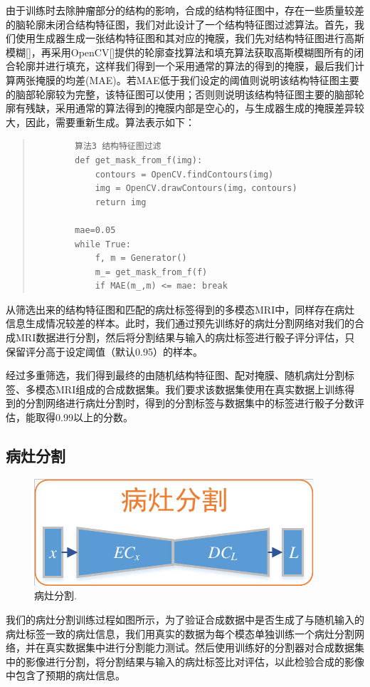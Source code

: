 \documentclass[letterpaper]{article} %
\begin{document}
由于训练时去除肿瘤部分的结构的影响，合成的结构特征图中，存在一些质量较差的脑轮廓未闭合结构特征图，我们对此设计了一个结构特征图过滤算法。首先，我们使用生成器生成一张结构特征图和其对应的掩膜，我们先对结构特征图进行高斯模糊[]，再采用OpenCV[]提供的轮廓查找算法和填充算法获取高斯模糊图所有的闭合轮廓并进行填充，这样我们得到一个采用通常的算法的得到的掩膜，最后我们计算两张掩膜的均差(MAE)。若MAE低于我们设定的阈值则说明该结构特征图主要的脑部轮廓较为完整，该特征图可以使用；否则则说明该结构特征图主要的脑部轮廓有残缺，采用通常的算法得到的掩膜内部是空心的，与生成器生成的掩膜差异较大，因此，需要重新生成。算法表示如下：
\begin{quote}
	\begin{scriptsize}\begin{verbatim}
		算法3 结构特征图过滤
		def get_mask_from_f(img):
			contours = OpenCV.findContours(img)
			img = OpenCV.drawContours(img，contours)
			return img
		
		mae=0.05
		while True:
			f, m = Generator()
			m_= get_mask_from_f(f)	
			if MAE(m_,m) <= mae: break
		\end{verbatim}\end{scriptsize}
\end{quote}

从筛选出来的结构特征图和匹配的病灶标签得到的多模态MRI中，同样存在病灶信息生成情况较差的样本。此时，我们通过预先训练好的病灶分割网络对我们的合成MRI数据进行分割，然后将分割结果与输入的病灶标签进行骰子评分评估，只保留评分高于设定阈值（默认0.95）的样本。

经过多重筛选，我们得到最终的由随机结构特征图、配对掩膜、随机病灶分割标签、多模态MRI组成的合成数据集。我们要求该数据集使用在真实数据上训练得到的分割网络进行病灶分割时，得到的分割标签与数据集中的标签进行骰子分数评估，能取得0.99以上的分数。

\subsection{病灶分割}
\begin{figure}
	\centering
	\includegraphics[width=0.98\linewidth]{figures/segmentation}
	\caption{病灶分割.}
	\label{segmentation}
\end{figure}
我们的病灶分割训练过程如图所示，为了验证合成数据中是否生成了与随机输入的病灶标签一致的病灶信息，我们用真实的数据为每个模态单独训练一个病灶分割网络，并在真实数据集中进行分割能力测试。然后使用训练好的分割器对合成数据集中的影像进行分割，将分割结果与输入的病灶标签比对评估，以此检验合成的影像中包含了预期的病灶信息。
\end{document}
